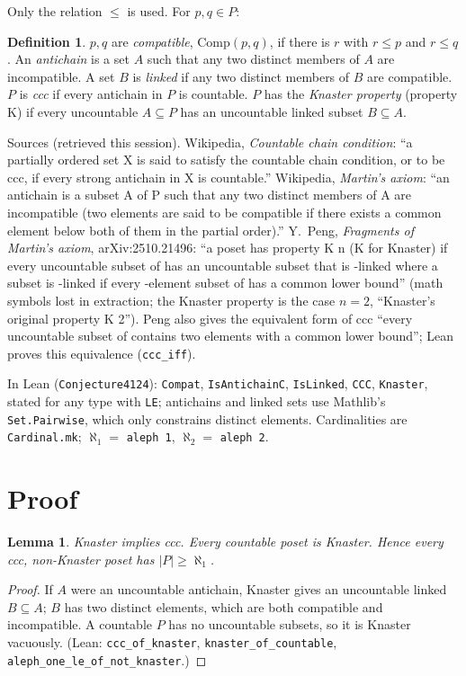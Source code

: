 \documentclass[11pt]{article}
\newtheorem{lemma}[theorem]{Lemma}
\theoremstyle{definition}
\newtheorem{definition}[theorem]{Definition}
\newcommand{\Comp}{\mathrm{Comp}}
\begin{document}
Only the relation $\le$ is used. For $p,q\in P$:
\begin{definition}
$p,q$ are \emph{compatible}, $\Comp(p,q)$, if there is $r$ with $r\le p$ and $r\le q$.
An \emph{antichain} is a set $A$ such that any two distinct members of $A$ are incompatible.
A set $B$ is \emph{linked} if any two distinct members of $B$ are compatible.
$P$ is \emph{ccc} if every antichain in $P$ is countable.
$P$ has the \emph{Knaster property} (property K) if every uncountable $A\subseteq P$ has an
uncountable linked subset $B\subseteq A$.
\end{definition}
Sources (retrieved this session). Wikipedia, \emph{Countable chain condition}: ``a partially
ordered set X is said to satisfy the countable chain condition, or to be ccc, if every strong
antichain in X is countable.'' Wikipedia, \emph{Martin's axiom}: ``an antichain is a subset A of P
such that any two distinct members of A are incompatible (two elements are said to be compatible
if there exists a common element below both of them in the partial order).'' Y.~Peng,
\emph{Fragments of Martin's axiom}, arXiv:2510.21496: ``a poset has property K n (K for Knaster) if
every uncountable subset of has an uncountable subset that is -linked where a subset is -linked if
every -element subset of has a common lower bound'' (math symbols lost in extraction; the
Knaster property is the case $n=2$, ``Knaster's original property K 2''). Peng also gives the
equivalent form of ccc ``every uncountable subset of contains two elements with a common lower
bound''; Lean proves this equivalence (\texttt{ccc\_iff}).

In Lean (\texttt{Conjecture4124}): \texttt{Compat}, \texttt{IsAntichainC}, \texttt{IsLinked},
\texttt{CCC}, \texttt{Knaster}, stated for any type with \texttt{LE}; antichains and linked sets
use Mathlib's \texttt{Set.Pairwise}, which only constrains distinct elements. Cardinalities are
\texttt{Cardinal.mk}; $\aleph_1=$ \texttt{aleph 1}, $\aleph_2=$ \texttt{aleph 2}.

\section{Proof}

\begin{lemma}\label{lem:hier}
Knaster implies ccc. Every countable poset is Knaster. Hence every ccc, non-Knaster poset has
$|P|\ge\aleph_1$.
\end{lemma}
\begin{proof}
If $A$ were an uncountable antichain, Knaster gives an uncountable linked $B\subseteq A$; $B$ has two
distinct elements, which are both compatible and incompatible. A countable $P$ has no uncountable
subsets, so it is Knaster vacuously. (Lean: \texttt{ccc\_of\_knaster}, \texttt{knaster\_of\_countable},
\texttt{aleph\_one\_le\_of\_not\_knaster}.)
\end{proof}
\end{document}
